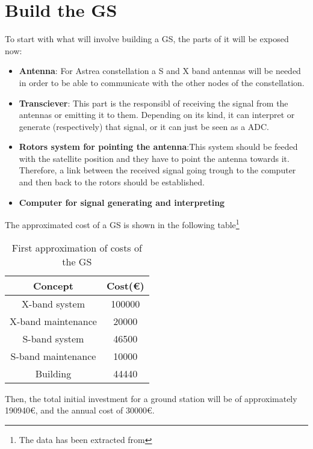 \section{Build the GS}
To start with what will involve building a GS, the parts of it will be exposed now:
\begin{itemize}
\item \textbf{Antenna}: For Astrea constellation a S and X band antennas will be needed in order to be able to communicate with the other nodes of the constellation.
\item \textbf{Transciever}: This part is the responsibl of receiving the signal from the antennas or emitting it to them. Depending on its kind, it can interpret or generate (respectively) that signal, or it can just be seen as a ADC. \item \textbf{Rotors system for pointing the antenna}:This system should be feeded with the satellite position and they have to point the antenna towards it. Therefore, a link between the received signal going trough to the computer and then back to the rotors should be established. 
\item \textbf{Computer for signal generating and interpreting}
\end{itemize}
The approximated cost of a GS is shown in the following table\footnote{The data has been extracted from\cite{XBand}\cite{SBand} }
\begin{table}[H]
\begin{center}
\begin{tabular}{|c|c|}
\hline
\textbf{Concept}&\textbf{Cost(\euro)}\\
\hline
X-band system&100000\\
\hline
X-band maintenance&20000\\
\hline
S-band system&46500\\
\hline
S-band maintenance&10000\\
\hline
Building&44440\\
\hline
\end{tabular}
\caption{First approximation of costs of the GS}
\end{center}
\end{table}
Then, the total initial investment for a ground station will be of approximately 190940\euro, and the annual cost of 30000\euro. 
